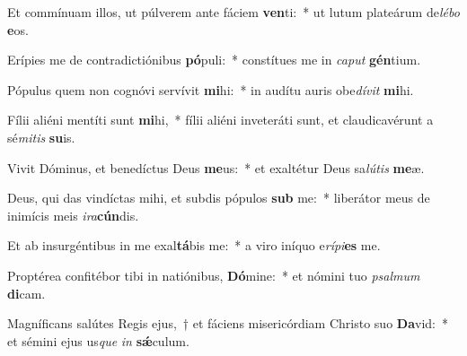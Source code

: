 \item Et commínuam illos, ut púlverem ante fáciem \textbf{ven}ti:~* ut lutum plateárum de\textit{lé}\textit{bo} \textbf{e}os.
\item Erípies me de contradictiónibus \textbf{pó}puli:~* constítues me in \textit{ca}\textit{put} \textbf{gén}tium.
\item Pópulus quem non cognóvi servívit \textbf{mi}hi:~* in audítu auris obe\textit{dí}\textit{vit} \textbf{mi}hi.
\item Fílii aliéni mentíti sunt \textbf{mi}hi,~* fílii aliéni inveteráti sunt, et claudicavérunt a sé\textit{mi}\textit{tis} \textbf{su}is.
\item Vivit Dóminus, et benedíctus Deus \textbf{me}us:~* et exaltétur Deus sa\textit{lú}\textit{tis} \textbf{me}æ.
\item Deus, qui das vindíctas mihi, et subdis pópulos \textbf{sub} me:~* liberátor meus de inimícis meis \textit{i}\textit{ra}\textbf{cún}dis.
\item Et ab insurgéntibus in me exal\textbf{tá}bis me:~* a viro iníquo e\textit{rí}\textit{pi}\textbf{es} me.
\item Proptérea confitébor tibi in natiónibus, \textbf{Dó}mine:~* et nómini tuo \textit{psal}\textit{mum} \textbf{di}cam.
\item Magníficans salútes Regis ejus,~† et fáciens misericórdiam Christo suo \textbf{Da}vid:~* et sémini ejus us\textit{que} \textit{in} \textbf{sǽ}culum.
